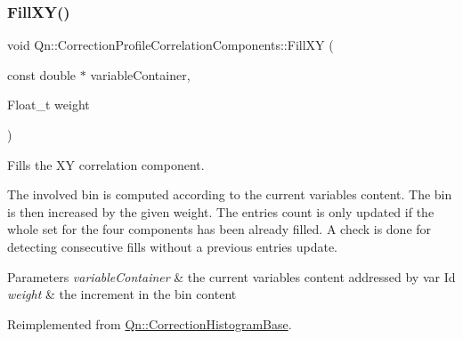 \mbox{\label{classQn_1_1CorrectionProfileCorrelationComponents_a05d2d17173f5a6aaccb4bd8cb9aece3a}} 
\subsubsection{\texorpdfstring{Fill\+X\+Y()}{FillXY()}}
{\footnotesize\ttfamily void Qn\+::\+Correction\+Profile\+Correlation\+Components\+::\+Fill\+XY (\begin{DoxyParamCaption}\item[{const double $\ast$}]{variable\+Container,  }\item[{Float\+\_\+t}]{weight }\end{DoxyParamCaption})\hspace{0.3cm}{\ttfamily [virtual]}}

Fills the XY correlation component.

The involved bin is computed according to the current variables content. The bin is then increased by the given weight. The entries count is only updated if the whole set for the four components has been already filled. A check is done for detecting consecutive fills without a previous entries update.


\begin{DoxyParams}{Parameters}
{\em variable\+Container} & the current variables content addressed by var Id \\
\hline
{\em weight} & the increment in the bin content \\
\hline
\end{DoxyParams}


Reimplemented from \mbox{\hyperlink{classQn_1_1CorrectionHistogramBase_a3ede7e510526e205704ec78e7c7254a3}{Qn\+::\+Correction\+Histogram\+Base}}.

\mbox{\label{classQn_1_1CorrectionProfileCorrelationComponents_a8c011aed3281ab3d9fd8fd83e43ad384}} 
